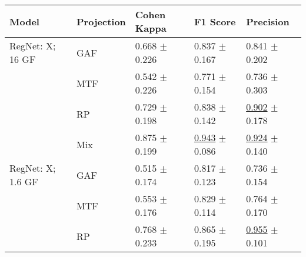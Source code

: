 
\begin{tabular}{lllll}
\toprule
Model & Projection & Cohen Kappa & F1 Score & Precision \\
\midrule
RegNet: X; 16 GF & GAF & \textcolor[rgb]{0.4823529412,0.5000000000,0}{0.668} $\pm$ \textcolor[rgb]{0.8082238591,0.1917761409,0}{0.226} & \textcolor[rgb]{0.3947844984,0.5000000000,0}{0.837} $\pm$ \textcolor[rgb]{0.5950883541,0.4049116459,0}{0.167} & \textcolor[rgb]{0.4005235602,0.5000000000,0}{0.841} $\pm$ \textcolor[rgb]{0.4959686841,0.5000000000,0}{0.202} \\
 & MTF & \textcolor[rgb]{0.7264705882,0.2735294118,0}{0.542} $\pm$ \textcolor[rgb]{0.8077447697,0.1922552303,0}{0.226} & \textcolor[rgb]{0.6149945672,0.3850054328,0}{0.771} $\pm$ \textcolor[rgb]{0.5220792004,0.4779207996,0}{0.154} & \textcolor[rgb]{0.7264397906,0.2735602094,0}{0.736} $\pm$ \textcolor[rgb]{0.9882089150,0.0117910850,0}{0.303} \\
 & RP & \textcolor[rgb]{0.3639705882,0.5000000000,0}{0.729} $\pm$ \textcolor[rgb]{0.7085309655,0.2914690345,0}{0.198} & \textcolor[rgb]{0.3918869975,0.5000000000,0}{0.838} $\pm$ \textcolor[rgb]{0.4514233130,0.5000000000,0}{0.142} & \underline{\textcolor[rgb]{0.2120418848,0.5000000000,0}{0.902}} $\pm$ \textcolor[rgb]{0.3778318982,0.5000000000,0}{0.178} \\
 & Mix & \textcolor[rgb]{0.0808823529,0.5000000000,0}{0.875} $\pm$ \textcolor[rgb]{0.7127864450,0.2872135550,0}{0.199} & \underline{\textcolor[rgb]{0.0398406375,0.5000000000,0}{0.943}} $\pm$ \textcolor[rgb]{0.1408376023,0.5000000000,0}{0.086} & \underline{\textcolor[rgb]{0.1433246073,0.5000000000,0}{0.924}} $\pm$ \textcolor[rgb]{0.1910808871,0.5000000000,0}{0.140} \\
RegNet: X; 1.6 GF & GAF & \textcolor[rgb]{0.7794117647,0.2205882353,0}{0.515} $\pm$ \textcolor[rgb]{0.6221710168,0.3778289832,0}{0.174} & \textcolor[rgb]{0.4594953519,0.5000000000,0}{0.817} $\pm$ \textcolor[rgb]{0.3479858267,0.5000000000,0}{0.123} & \textcolor[rgb]{0.7264397906,0.2735602094,0}{0.736} $\pm$ \textcolor[rgb]{0.2617489421,0.5000000000,0}{0.154} \\
 & MTF & \textcolor[rgb]{0.7058823529,0.2941176471,0}{0.553} $\pm$ \textcolor[rgb]{0.6286185571,0.3713814429,0}{0.176} & \textcolor[rgb]{0.4223107570,0.5000000000,0}{0.829} $\pm$ \textcolor[rgb]{0.2968093279,0.5000000000,0}{0.114} & \textcolor[rgb]{0.6400523560,0.3599476440,0}{0.764} $\pm$ \textcolor[rgb]{0.3377261871,0.5000000000,0}{0.170} \\
 & RP & \textcolor[rgb]{0.2882352941,0.5000000000,0}{0.768} $\pm$ \textcolor[rgb]{0.8315938835,0.1684061165,0}{0.233} & \textcolor[rgb]{0.3006157189,0.5000000000,0}{0.865} $\pm$ \textcolor[rgb]{0.7487268837,0.2512731163,0}{0.195} & \underline{\textcolor[rgb]{0.0471204188,0.5000000000,0}{0.955}} $\pm$ \textcolor[rgb]{0.0030521441,0.5000000000,0}{0.101} \\

\end{tabular}
